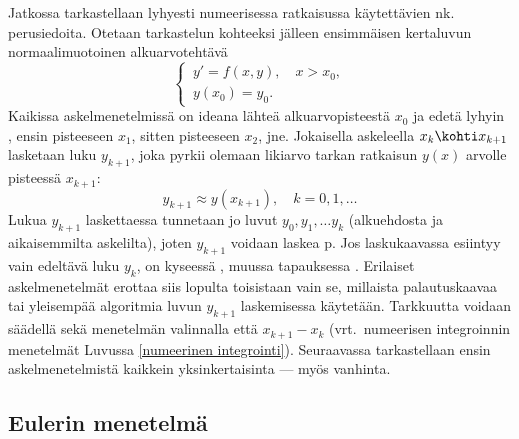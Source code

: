 Jatkossa tarkastellaan lyhyesti  numeerisessa ratkaisussa käytettävien
%
nk.\  perusiedoita. Otetaan tarkastelun kohteeksi jälleen ensimmäisen
kertaluvun normaalimuotoinen alkuarvotehtävä
\begin{equation} \label{dy-7: ivp}
\begin{cases}
\,y'=f(x,y),\quad x>x_0, \\
\,y(x_0)=y_0.
\end{cases}
\end{equation}
Kaikissa askelmenetelmissä on ideana lähteä alkuarvopisteestä $x_0$ ja edetä lyhyin 
, ensin pisteeseen $x_1$, sitten pisteeseen $x_2$, jne. Jokaisella askeleella
$x_k \kohti x_{k+1}$ lasketaan luku $y_{k+1}$, joka pyrkii olemaan likiarvo tarkan ratkaisun
$y(x)$ arvolle pisteessä $x_{k+1}$:
\[
y_{k+1}\approx y(x_{k+1}),\quad k=0,1,\ldots
\]
Lukua $y_{k+1}$ laskettaessa tunnetaan jo luvut $y_0,y_1, \ldots y_{k}$ (alkuehdosta ja 
aikaisemmilta askelilta), joten $y_{k+1}$ voidaan laskea p. Jos laskukaavassa
esiintyy vain edeltävä luku $y_k$, on kyseessä 
, muussa tapauksessa .
Erilaiset askelmenetelmät erottaa siis lopulta toisistaan vain se,
millaista palautuskaavaa tai yleisempää algoritmia luvun $y_{k+1}$ laskemisessa käytetään.
Tarkkuutta voidaan säädellä sekä menetelmän valinnalla että
%
 $x_{k+1}-x_k$ (vrt.\ numeerisen integroinnin menetelmät Luvussa
\ref{numeerinen integrointi}). Seuraavassa tarkastellaan ensin askelmenetelmistä kaikkein
yksinkertaisinta --- myös vanhinta.

\subsection*{Eulerin menetelmä}

